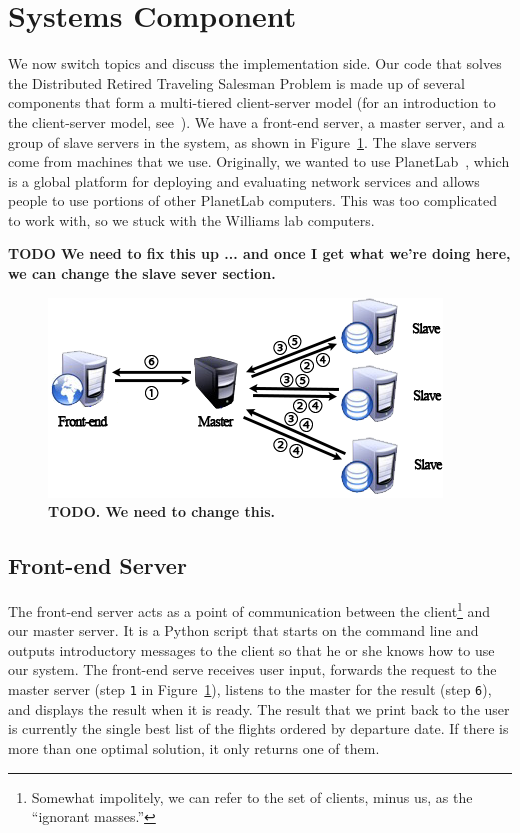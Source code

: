 \documentclass{article}
\begin{document}
\section{Systems Component}\label{sec:systems}

We now switch topics and discuss the implementation side. Our code that solves the Distributed Retired Traveling Salesman Problem is made up of
several components that form a multi-tiered client-server model (for an introduction to the client-server model,
see~\cite{Tanenbaum:2006:DSP:1202502}).  We have a front-end server, a master server, and a group of slave servers in the system, as shown in
Figure~\ref{fig:machines}. The slave servers come from machines that we use. Originally, we wanted to use PlanetLab~\cite{conf/osdi/PetersonBFM06},
which is a global platform for deploying and evaluating network services and allows people to use portions of other PlanetLab computers. This was too
complicated to work with, so we stuck with the Williams lab computers.

{\bf TODO We need to fix this up ... and once I get what we're doing here, we can change the slave sever section.}

\begin{figure}[t]
\vskip 0.2in
\begin{center}
\centerline{\includegraphics[width=\columnwidth]{servers}}
\caption{{\bf TODO. We need to change this.}}
\label{fig:machines}
\end{center}
\vskip -0.2in
\end{figure}

\subsection{Front-end Server}\label{sec:front_end_server}

The front-end server acts as a point of communication between the client\footnote{Somewhat impolitely, we can refer to the set of clients, minus us,
as the ``ignorant masses.''} and our master server. It is a Python script that starts on the command line and outputs introductory messages to the
client so that he or she knows how to use our system. The front-end serve receives user input, forwards the request to the master server (step
\texttt{1} in Figure~\ref{fig:machines}), listens to the master for the result (step \texttt{6}), and displays the result when it is ready. The result
that we print back to the user is currently the single best list of the flights ordered by departure date. If there is more than one optimal solution,
it only returns one of them.
\end{document}
